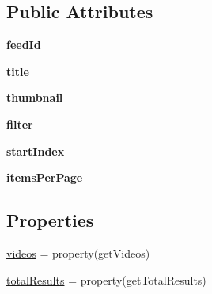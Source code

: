\subsection*{\-Public \-Attributes}
\begin{DoxyCompactItemize}
\item 
\hypertarget{class_sbs_on_demand_1_1_feed_1_1_feed_ab484176f2dbbab59b5bdcc3888790863}{
{\bfseries feed\-Id}}
\label{class_sbs_on_demand_1_1_feed_1_1_feed_ab484176f2dbbab59b5bdcc3888790863}

\item 
\hypertarget{class_sbs_on_demand_1_1_feed_1_1_feed_ad59a08faa41c6dc3e926e398c8f8805e}{
{\bfseries title}}
\label{class_sbs_on_demand_1_1_feed_1_1_feed_ad59a08faa41c6dc3e926e398c8f8805e}

\item 
\hypertarget{class_sbs_on_demand_1_1_feed_1_1_feed_a95fbf7e6288acd687a3a5c6eeb3ee5ee}{
{\bfseries thumbnail}}
\label{class_sbs_on_demand_1_1_feed_1_1_feed_a95fbf7e6288acd687a3a5c6eeb3ee5ee}

\item 
\hypertarget{class_sbs_on_demand_1_1_feed_1_1_feed_ad185fca8e70e2ba988d9b04fc3615c02}{
{\bfseries filter}}
\label{class_sbs_on_demand_1_1_feed_1_1_feed_ad185fca8e70e2ba988d9b04fc3615c02}

\item 
\hypertarget{class_sbs_on_demand_1_1_feed_1_1_feed_aace81bddf265a1c51a02e43fe58bd36e}{
{\bfseries start\-Index}}
\label{class_sbs_on_demand_1_1_feed_1_1_feed_aace81bddf265a1c51a02e43fe58bd36e}

\item 
\hypertarget{class_sbs_on_demand_1_1_feed_1_1_feed_ae65666b1d68fdd2ad61741c5e4ebdfbf}{
{\bfseries items\-Per\-Page}}
\label{class_sbs_on_demand_1_1_feed_1_1_feed_ae65666b1d68fdd2ad61741c5e4ebdfbf}

\end{DoxyCompactItemize}
\subsection*{\-Properties}
\begin{DoxyCompactItemize}
\item 
\hyperlink{class_sbs_on_demand_1_1_feed_1_1_feed_a7cffcd6dbfb3458501f0fc7758788785}{videos} = property(get\-Videos)
\item 
\hyperlink{class_sbs_on_demand_1_1_feed_1_1_feed_a4729512e6b96e31d080751d5ef28fc2d}{total\-Results} = property(get\-Total\-Results)
\end{DoxyCompactItemize}
